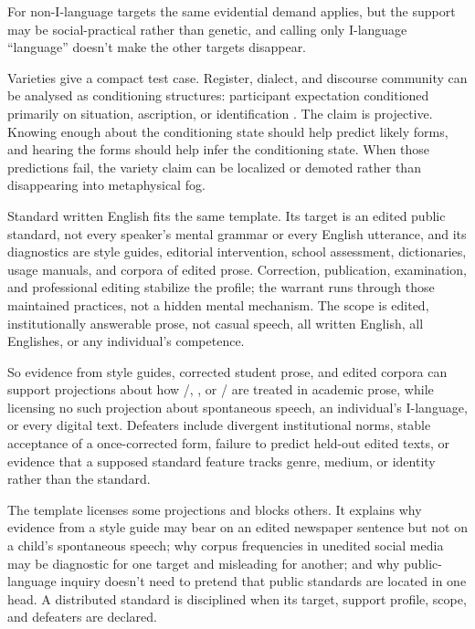 \documentclass[12pt]{article}
\begin{document}
For non-I-language targets the same evidential demand applies, but the support may be social-practical rather than genetic, and calling only I-language \enquote{language} doesn't make the other targets disappear.

Varieties give a compact test case. Register, dialect, and discourse community can be analysed as conditioning structures: participant expectation conditioned primarily on situation, ascription, or identification \citep{reynolds2026varieties}. The claim is projective. Knowing enough about the conditioning state should help predict likely forms, and hearing the forms should help infer the conditioning state. When those predictions fail, the variety claim can be localized or demoted rather than disappearing into metaphysical fog.

Standard written English fits the same template. Its target is an edited public standard, not every speaker's mental grammar or every English utterance, and its diagnostics are style guides, editorial intervention, school assessment, dictionaries, usage manuals, and corpora of edited prose. Correction, publication, examination, and professional editing stabilize the profile; the warrant runs through those maintained practices, not a hidden mental mechanism. The scope is edited, institutionally answerable prose, not casual speech, all written English, all Englishes, or any individual's competence.

So evidence from style guides, corrected student prose, and edited corpora can support projections about how /, , or / are treated in academic prose, while licensing no such projection about spontaneous speech, an individual's I-language, or every digital text. Defeaters include divergent institutional norms, stable acceptance of a once-corrected form, failure to predict held-out edited texts, or evidence that a supposed standard feature tracks genre, medium, or identity rather than the standard.

The template licenses some projections and blocks others. It explains why evidence from a style guide may bear on an edited newspaper sentence but not on a child's spontaneous speech; why corpus frequencies in unedited social media may be diagnostic for one target and misleading for another; and why public-language inquiry doesn't need to pretend that public standards are located in one head. A distributed standard is disciplined when its target, support profile, scope, and defeaters are declared.
\end{document}
